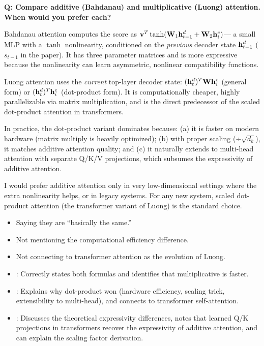 \begin{interviewq}
\textbf{Q: Compare additive (Bahdanau) and multiplicative (Luong)
attention. When would you prefer each?}

 \quad {} \quad
\badgefreq{\freqmed}

\stronganswer
Bahdanau attention computes the score as
$\mathbf{v}^T \tanh(\mathbf{W}_1 \mathbf{h}_{t-1}^d + \mathbf{W}_2 \mathbf{h}_i^e)$---
a small MLP with a $\tanh$ nonlinearity, conditioned on the
\emph{previous} decoder state $\mathbf{h}_{t-1}^d$ ($s_{t-1}$ in the paper).
It has three parameter matrices
and is more expressive because the nonlinearity can learn asymmetric,
nonlinear compatibility functions.

Luong attention uses the \emph{current} top-layer decoder state:
$(\mathbf{h}_t^d)^T \mathbf{W} \mathbf{h}_i^e$ (general form) or
$(\mathbf{h}_t^d)^T \mathbf{h}_i^e$ (dot-product form).
It is computationally cheaper, highly parallelizable via matrix
multiplication, and is the direct predecessor of the scaled dot-product
attention in transformers.

In practice, the dot-product variant dominates because: (a) it is faster
on modern hardware (matrix multiply is heavily optimized); (b) with
proper scaling ($\div\sqrt{d_k}$), it matches additive attention quality;
and (c) it naturally extends to multi-head attention with separate Q/K/V
projections, which subsumes the expressivity of additive attention.

I would prefer additive attention only in very low-dimensional settings
where the extra nonlinearity helps, or in legacy systems.  For any new
system, scaled dot-product attention (the transformer variant of Luong)
is the standard choice.

\redflags
\begin{itemize}
\item Saying they are ``basically the same.''
\item Not mentioning the computational efficiency difference.
\item Not connecting to transformer attention as the evolution of Luong.
\end{itemize}


\goodgreat
\begin{itemize}
\item {}: Correctly states both formulas and identifies
  that multiplicative is faster.
\item {}: Explains why dot-product won (hardware efficiency,
  scaling trick, extensibility to multi-head), and connects to
  transformer self-attention.
\item {}: Discusses the theoretical expressivity
  differences, notes that learned Q/K projections in transformers
  recover the expressivity of additive attention, and can explain the
  scaling factor derivation.
\end{itemize}


\end{interviewq}
